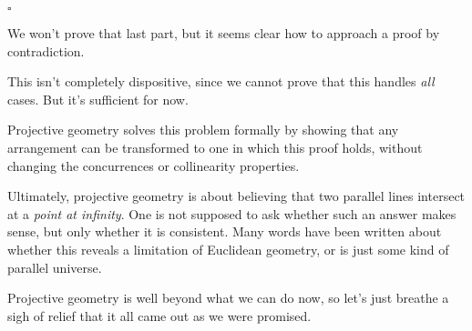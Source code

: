 \documentclass[11pt, oneside]{article}
\begin{document}
$\square$

We won't prove that last part, but it seems clear how to approach a proof by contradiction.

This isn't completely dispositive, since we cannot prove that this handles \emph{all} cases.  But it's sufficient for now.

Projective geometry solves this problem formally by showing that any arrangement can be transformed to one in which this proof holds, without changing the concurrences or collinearity properties.

Ultimately, projective geometry is about believing that two parallel lines intersect at a \emph{point at infinity}.  One is not supposed to ask whether such an answer makes sense, but only whether it is consistent.  Many words have been written about whether this reveals a limitation of Euclidean geometry, or is just some kind of parallel universe.

Projective geometry is well beyond what we can do now, so let's just breathe a sigh of relief that it all came out as we were promised.
\end{document}
